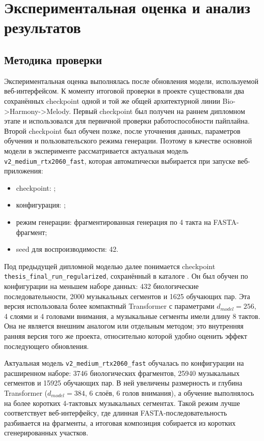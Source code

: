 \chapter{Экспериментальная оценка и анализ результатов}

\section{Методика проверки}

Экспериментальная оценка выполнялась после обновления модели, используемой веб-интерфейсом. К моменту итоговой проверки в проекте существовали два сохранённых checkpoint одной и той же общей архитектурной линии Bio->Harmony->Melody. Первый checkpoint был получен на раннем дипломном этапе и использовался для первичной проверки работоспособности пайплайна. Второй checkpoint был обучен позже, после уточнения данных, параметров обучения и пользовательского режима генерации. Поэтому в качестве основной модели в эксперименте рассматривается актуальная модель \texttt{v2\_medium\_rtx2060\_fast}, которая автоматически выбирается при запуске веб-приложения:

\begin{itemize}
\item checkpoint: ;
\item конфигурация: ;
\item режим генерации: фрагментированная генерация по 4 такта на FASTA-фрагмент;
\item seed для воспроизводимости: 42.
\end{itemize}

Под предыдущей дипломной моделью далее понимается checkpoint \texttt{thesis\_final\_run\_regularized}, сохранённый в каталоге . Он был обучен по конфигурации  на меньшем наборе данных: 432 биологические последовательности, 2000 музыкальных сегментов и 1625 обучающих пар. Эта версия использовала более компактный Transformer с параметрами \(d_{model}=256\), 4 слоями и 4 головами внимания, а музыкальные сегменты имели длину 8 тактов. Она не является внешним аналогом или отдельным методом; это внутренняя ранняя версия того же проекта, относительно которой удобно оценить эффект последующего обновления.

Актуальная модель \texttt{v2\_medium\_rtx2060\_fast} обучалась по конфигурации  на расширенном наборе: 3746 биологических фрагментов, 25940 музыкальных сегментов и 15925 обучающих пар. В ней увеличены размерность и глубина Transformer (\(d_{model}=384\), 6 слоёв, 6 голов внимания), а обучение выполнялось на более коротких 4-тактовых музыкальных сегментах. Такой режим лучше соответствует веб-интерфейсу, где длинная FASTA-последовательность разбивается на фрагменты, а итоговая композиция собирается из коротких сгенерированных участков.

